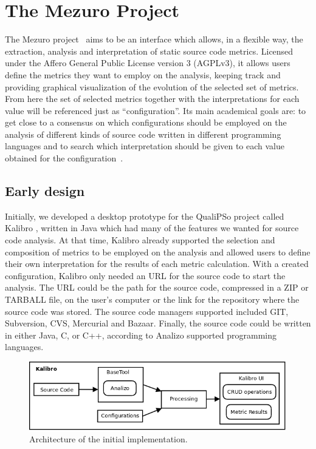 \section{The Mezuro Project}
\label{sec:mezuro}

The Mezuro project~\cite{mezuro2012} aims to be an interface which allows, in a
flexible way, the extraction, analysis and interpretation of static source code
metrics. Licensed under the Affero General Public License version 3 (AGPLv3),
it allows users define the metrics they want to employ on the analysis, keeping
track and providing graphical visualization of the evolution of the selected
set of metrics. From here the set of selected metrics together with the
interpretations for each value  will be referenced just as ``configuration''.
Its main academical goals are: to get close to a consensus on which
configurations should be employed on the analysis of different kinds of source
code written in different programming languages and to search which
interpretation should be given to each value obtained for the
configuration~\cite{meirelles2013}.

\subsection{Early design}
\label{subsec:early-design}

Initially, we developed a desktop prototype for the QualiPSo project called
Kalibro \cite{de2013kalibro}, written in Java which had many of the features we
wanted for source code analysis. At that time, Kalibro already supported the
selection and composition of metrics to be employed on the analysis and allowed
users to define their own interpretation for the results of each metric
calculation.  With a created configuration, Kalibro only needed an URL for the
source code to start the analysis. The URL could be the path for the source
code, compressed in a ZIP or TARBALL file, on the user's computer or the link
for the repository where the source code was stored. The source code managers
supported included GIT, Subversion, CVS, Mercurial and Bazaar. Finally, the
source code could be written in either Java, C, or C++, according to Analizo
supported programming languages.

\begin{figure}[htb]
  \centering
  \includegraphics[width=\textwidth]{images/kalibro-initial-arch.png}
  \caption{Architecture of the initial implementation.}
  \label{fig:kalibro-initial-arch}
\end{figure}

